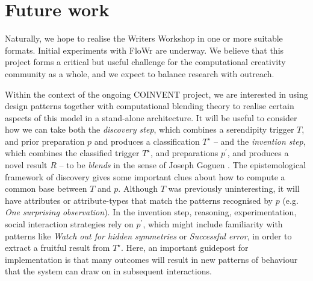 \section{Future work}

Naturally, we hope to realise the Writers Workshop in one or more
suitable formats.  Initial experiments with {\sf FloWr} are underway.
We believe that this project forms a critical but useful challenge for
the computational creativity community as a whole, and we expect to
balance research with outreach.

Within the context of the ongoing COINVENT project, we are interested
in using design patterns together with computational blending theory
to realise certain aspects of this model in a stand-alone
architecture.
%
It will be useful to consider how we can take both the \emph{discovery
  step}, which combines a serendipity trigger $T$, and prior
preparation $p$ and produces a classification $T^{\star}$ -- and the
\emph{invention step}, which combines the classified trigger
$T^{\star}$, and preparations $p^{\prime}$, and produces a novel
result $R$ -- to be \emph{blends} in the sense of Joseph Goguen
\cite{goguen1999introduction}.  The epistemological framework of
discovery gives some important clues about how to compute a common
base between $T$ and $p$.  Although $T$ was previously uninteresting,
it will have attributes or attribute-types that match the patterns
recognised by $p$ (e.g. \emph{One surprising observation}).  In the
invention step, reasoning, experimentation, social interaction
strategies rely on $p^{\prime}$, which might include familiarity with
patterns like \emph{Watch out for hidden symmetries} or
\emph{Successful error}, in order to extract a fruitful result from
$T^{\star}$.  Here, an important guidepost for implementation is that
many outcomes will result in new patterns of behaviour that the system
can draw on in subsequent interactions.
